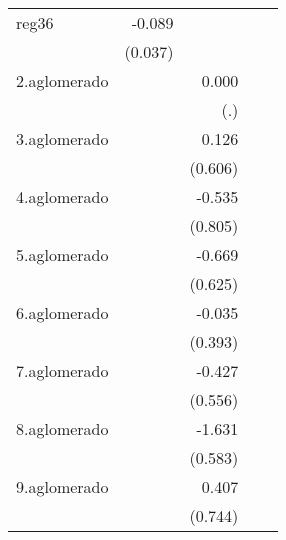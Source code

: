 {\begin{longtable}{l*{4}{D{.}{.}{-1}}}
\addlinespace
reg36       &      -0.089\sym{*}  &                     &                     &                     \\
            &     (0.037)         &                     &                     &                     \\
\addlinespace
2.aglomerado&                     &       0.000         &                     &                     \\
            &                     &         (.)         &                     &                     \\
\addlinespace
3.aglomerado&                     &       0.126         &                     &                     \\
            &                     &     (0.606)         &                     &                     \\
\addlinespace
4.aglomerado&                     &      -0.535         &                     &                     \\
            &                     &     (0.805)         &                     &                     \\
\addlinespace
5.aglomerado&                     &      -0.669         &                     &                     \\
            &                     &     (0.625)         &                     &                     \\
\addlinespace
6.aglomerado&                     &      -0.035         &                     &                     \\
            &                     &     (0.393)         &                     &                     \\
\addlinespace
7.aglomerado&                     &      -0.427         &                     &                     \\
            &                     &     (0.556)         &                     &                     \\
\addlinespace
8.aglomerado&                     &      -1.631\sym{**} &                     &                     \\
            &                     &     (0.583)         &                     &                     \\
\addlinespace
9.aglomerado&                     &       0.407         &                     &                     \\
            &                     &     (0.744)         &                     &                     \\

\end{longtable}}
